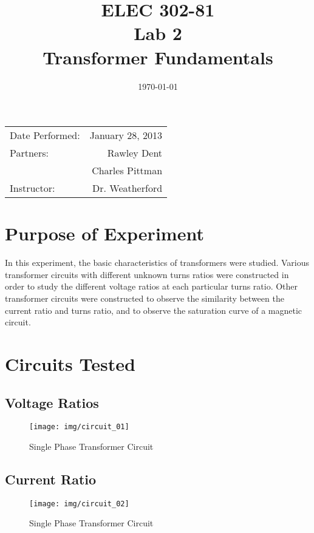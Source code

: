 \documentclass{article}
\title{ELEC 302-81\\ Lab 2\\ Transformer Fundamentals} %
\date{\today} %
\begin{document}
\maketitle

\begin{center}
  \begin{tabular}{lr}
    Date Performed: & January 28, 2013 \\
    Partners: & Rawley Dent \\
              & Charles Pittman \\
    Instructor: & Dr. Weatherford
  \end{tabular}
\end{center}

\pagebreak


\section{Purpose of Experiment}
In this experiment, the basic characteristics of transformers were studied. Various transformer circuits 
with different unknown turns ratios were constructed in order to study the different voltage ratios at each particular 
turns ratio. Other transformer circuits were constructed to observe the similarity between the current ratio 
and turns ratio, and to observe the saturation curve of a magnetic circuit.

\section{Circuits Tested}
\subsection{Voltage Ratios}
\begin{figure}[H]
  \centering
  \texttt{[image: img/circuit\_01]}
  \caption{Single Phase Transformer Circuit}
  \label{fig:circuit_01}
\end{figure}

\subsection{Current Ratio}
\begin{figure}[H]
  \centering
  \texttt{[image: img/circuit\_02]}
  \caption{Single Phase Transformer Circuit}
  \label{fig:circuit_02}
\end{figure}
\end{document}
